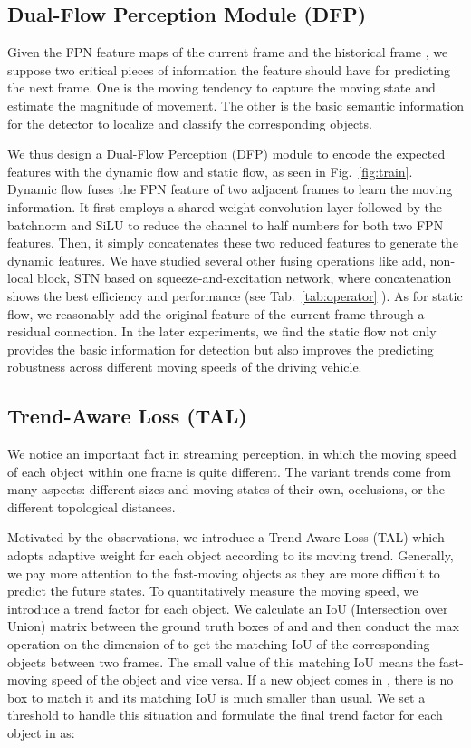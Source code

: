 \documentclass[10pt,twocolumn,letterpaper]{article}
\begin{document}
\subsection{Dual-Flow Perception Module (DFP)}
Given the FPN feature maps of the current frame  and the historical frame , we suppose two critical pieces of information the feature should have for predicting the next frame. One is the moving tendency to capture the moving state and estimate the magnitude of movement. The other is the basic semantic information for the detector to localize and classify the corresponding objects.

We thus design a Dual-Flow Perception (DFP) module to encode the expected features with the dynamic flow and static flow, as seen in Fig.~\ref{fig:train}. Dynamic flow fuses the FPN feature of two adjacent frames to learn the moving information. It first employs a shared weight  convolution layer followed by the batchnorm and SiLU \cite{swish} to reduce the channel to half numbers for both two FPN features. Then, it simply concatenates these two reduced features to generate the dynamic features. We have studied several other fusing operations like add, non-local block\cite{nonlocal}, STN\cite{stn} based on squeeze-and-excitation network\cite{senet}, where concatenation shows the best efficiency and performance (see Tab.~\ref{tab:operator} ). As for static flow, we reasonably add the original feature of the current frame through a residual connection. In the later experiments, we find the static flow not only provides the basic information for detection but also improves the predicting robustness across different moving speeds of the driving vehicle. 

\subsection{Trend-Aware Loss (TAL)}
We notice an important fact in streaming perception, in which the moving speed of each object within one frame is quite different. The variant trends come from many aspects: different sizes and moving states of their own, occlusions, or the different topological distances. 

Motivated by the observations, we introduce a Trend-Aware Loss (TAL) which adopts adaptive weight for each object according to its moving trend. Generally, we pay more attention to the fast-moving objects as they are more difficult to predict the future states. To quantitatively measure the moving speed, we introduce a trend factor for each object. We calculate an IoU (Intersection over Union) matrix between the ground truth boxes of  and  and then conduct the max operation on the dimension of  to get the matching IoU of the corresponding objects between two frames. The small value of this matching IoU means the fast-moving speed of the object and vice versa. 
If a new object comes in , there is no box to match it and its matching IoU is much smaller than usual. We set a threshold  to handle this situation and formulate the final trend factor  for each object in  as:
\end{document}

